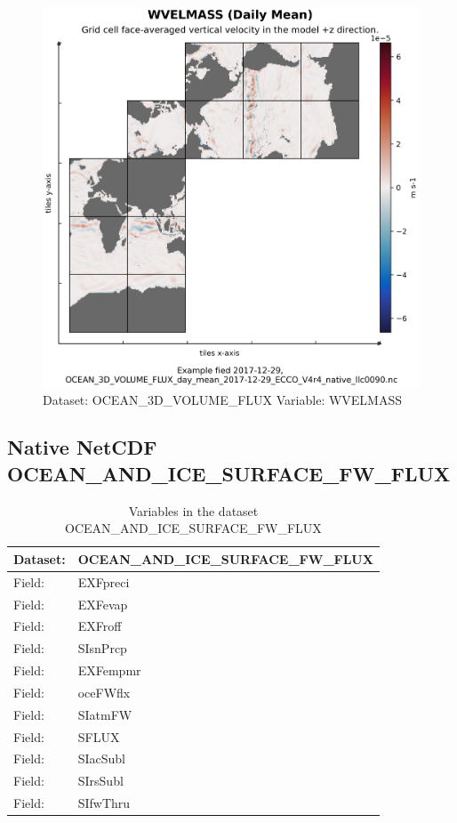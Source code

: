 \begin{figure}[H]
\centering
\includegraphics[scale=0.55]{../images/plots/native_plots/Ocean_Three-Dimensional_Volume_Fluxes/WVELMASS.png}
\caption{Dataset: OCEAN\_3D\_VOLUME\_FLUX Variable: WVELMASS}
\label{tab:table-OCEAN_3D_VOLUME_FLUX_WVELMASS-Plot}
\end{figure}
\pagebreak
\subsection{Native NetCDF OCEAN\_AND\_ICE\_SURFACE\_FW\_FLUX}
\newp
\begin{longtable}{|p{}|p{}|}
\caption{Variables in the dataset OCEAN\_AND\_ICE\_SURFACE\_FW\_FLUX}
\label{tab:table-OCEAN_AND_ICE_SURFACE_FW_FLUX-fields} \\ 
\hline \endhead \hline \endfoot
\rowcolor{lightgray} \textbf{Dataset:} & \textbf{OCEAN\_AND\_ICE\_SURFACE\_FW\_FLUX} \\ \hline
Field: &EXFpreci \\ \hline
Field: &EXFevap \\ \hline
Field: &EXFroff \\ \hline
Field: &SIsnPrcp \\ \hline
Field: &EXFempmr \\ \hline
Field: &oceFWflx \\ \hline
Field: &SIatmFW \\ \hline
Field: &SFLUX \\ \hline
Field: &SIacSubl \\ \hline
Field: &SIrsSubl \\ \hline
Field: &SIfwThru \\ \hline
\end{longtable}

